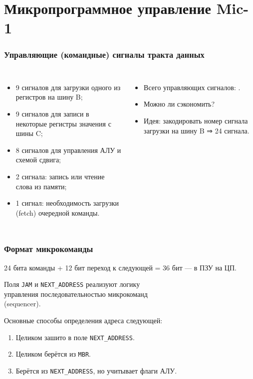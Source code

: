 \section{Микропрограммное управление Mic-1}

\begin{frame}
\frametitle{Управляющие (командные) сигналы тракта данных}
\begin{columns}
        \column{3.5cm}

        \column{9cm}

\pause\begin{itemize}\small
    \item 9 сигналов для загрузки одного из регистров на шину B;
    \item 9 сигналов для записи в некоторые регистры значения с шины C;
    \item 8 сигналов для управления АЛУ и схемой сдвига;
    \item 2 сигнала: запись или чтение слова из памяти;
    \item 1 сигнал: необходимость загрузки (fetch) очередной команды.
\end{itemize}

\pause\begin{itemize}
\item Всего управляющих сигналов: .
\pause \item Можно ли сэкономить?
\pause \item Идея: закодировать номер сигнала загрузки на шину B \pause ⇒ 24 сигнала.
\end{itemize}
\end{columns}

\end{frame}

\begin{frame}
\frametitle{Формат микрокоманды}
\small 24 бита команды + 12 бит переход к следующей = 36 бит — в ПЗУ на ЦП.

\pause


\pause

\vspace{-2.5cm}
Поля \texttt{JAM} и \texttt{NEXT\_ADDRESS} реализуют логику \\
    \alert{управления последовательностью микрокоманд}\\
    (\alert{sequencer}).

\pause

\vspace{.2cm}
Основные способы определения адреса следующей:
\begin{enumerate}\itemsep=0cm
  \item Целиком зашито в поле \texttt{NEXT\_ADDRESS}.
  \item Целиком берётся из \texttt{MBR}.
  \item Берётся из \texttt{NEXT\_ADDRESS}, но учитывает флаги АЛУ.
\end{enumerate}
\end{frame}

